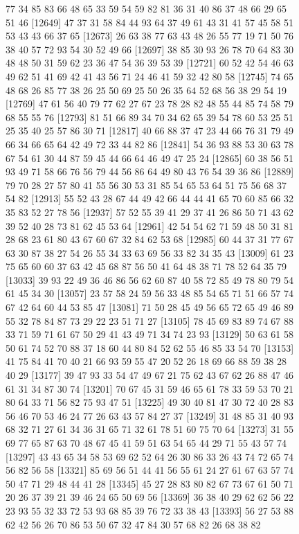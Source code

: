 \documentclass{article}
\begin{document}
\begin{figure}[H]
\begin{Schunk}
\begin{Soutput}
[12625] 77 34 85 83 66 48 65 33 59 54 59 82 81 36 31 40 86 37 48 66 29 65 51 46
[12649] 47 37 31 58 84 44 93 64 37 49 61 43 31 41 57 45 58 51 53 43 43 66 37 65
[12673] 26 63 38 77 63 43 48 26 55 77 19 71 50 76 38 40 57 72 93 54 30 52 49 66
[12697] 38 85 30 93 26 78 70 64 83 30 48 48 50 31 59 62 23 36 47 54 36 39 53 39
[12721] 60 52 42 54 46 63 49 62 51 41 69 42 41 43 56 71 24 46 41 59 32 42 80 58
[12745] 74 65 48 68 26 85 77 38 26 25 50 69 25 50 26 35 64 52 68 56 38 29 54 19
[12769] 47 61 56 40 79 77 62 27 67 23 78 28 82 48 55 44 85 74 58 79 68 55 55 76
[12793] 81 51 66 89 34 70 34 62 65 39 54 78 60 53 25 51 25 35 40 25 57 86 30 71
[12817] 40 66 88 37 47 23 44 66 76 31 79 49 66 34 66 65 64 42 49 72 33 44 82 86
[12841] 54 36 93 88 53 30 63 78 67 54 61 30 44 87 59 45 44 66 64 46 49 47 25 24
[12865] 60 38 56 51 93 49 71 58 66 76 56 79 44 56 86 64 49 80 43 76 54 39 36 86
[12889] 79 70 28 27 57 80 41 55 56 30 53 31 85 54 65 53 64 51 75 56 68 37 54 82
[12913] 55 52 43 28 67 44 49 42 66 44 44 41 65 70 60 85 66 32 35 83 52 27 78 56
[12937] 57 52 55 39 41 29 37 41 26 86 50 71 43 62 39 52 40 28 73 81 62 45 53 64
[12961] 42 54 54 62 71 59 48 50 31 81 28 68 23 61 80 43 67 60 67 32 84 62 53 68
[12985] 60 44 37 31 77 67 63 30 87 38 27 54 26 55 34 33 63 69 56 33 82 34 35 43
[13009] 61 23 75 65 60 60 37 63 42 45 68 87 56 50 41 64 48 38 71 78 52 64 35 79
[13033] 39 93 22 49 36 46 86 56 62 60 87 40 58 72 85 49 78 80 79 54 61 45 34 30
[13057] 23 57 58 24 59 56 33 48 85 54 65 71 51 66 57 74 67 42 64 60 44 53 85 47
[13081] 71 50 28 45 49 56 65 72 65 49 46 89 55 32 78 84 87 73 29 22 23 51 71 27
[13105] 78 45 69 83 89 74 67 88 33 71 59 71 61 67 50 29 41 43 49 71 34 74 23 93
[13129] 50 63 61 58 50 61 74 52 70 88 37 18 60 44 80 84 52 62 55 46 85 33 54 70
[13153] 41 75 84 41 70 40 21 66 93 59 55 47 20 52 26 18 69 66 88 59 38 28 40 29
[13177] 39 47 93 33 54 47 49 67 21 75 62 43 67 62 26 88 47 46 61 31 34 87 30 74
[13201] 70 67 45 31 59 46 65 61 78 33 59 53 70 21 80 64 33 71 56 82 75 93 47 51
[13225] 49 30 40 81 47 30 72 40 28 83 56 46 70 53 46 24 77 26 63 43 57 84 27 37
[13249] 31 48 85 31 40 93 68 32 71 27 61 34 36 31 65 71 32 61 78 51 60 75 70 64
[13273] 31 55 69 77 65 87 63 70 48 67 45 41 59 51 63 54 65 44 29 71 55 43 57 74
[13297] 43 43 65 34 58 53 69 62 52 64 26 30 86 33 26 43 74 72 65 74 56 82 56 58
[13321] 85 69 56 51 44 41 56 55 61 24 27 61 67 63 57 74 50 47 71 29 48 44 41 28
[13345] 45 27 28 83 80 82 67 73 67 61 50 71 20 26 37 39 21 39 46 24 65 50 69 56
[13369] 36 38 40 29 62 62 56 22 23 93 55 32 33 72 53 93 68 85 39 76 72 33 38 43
[13393] 56 27 53 88 62 42 56 26 70 86 53 50 67 32 47 84 30 57 68 82 26 68 38 82

\end{Soutput}
\end{Schunk}
\end{figure}
\end{document}
